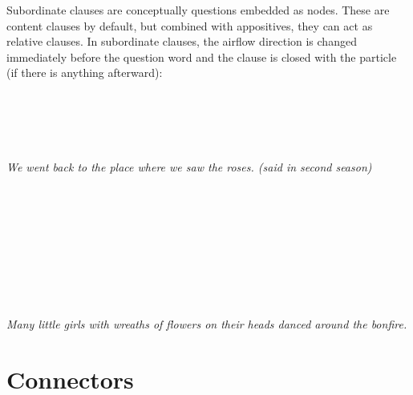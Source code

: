 \documentclass{book}
\begin{document}
Subordinate clauses are conceptually questions embedded as nodes. These are content clauses by default, but combined with appositives, they can act as relative clauses. In subordinate clauses, the airflow direction is changed immediately before the question word and the clause is closed with the particle  (if there is anything afterward): \\
~\\
 \\
 \\
          \\
~\\
\emph{We went back to the place where we saw the roses. (said in second season)} \\
~\\
 \\
 \\
  \hliii{=}       \hlx{$\lrcorner$} \\
~\\
 \\
 \\
    \\
~\\
\emph{Many little girls with wreaths of flowers on their heads danced around the bonfire.}

\section{Connectors}
\end{document}
